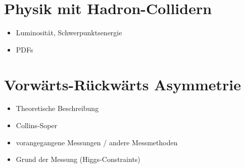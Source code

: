 \section{Physik mit Hadron-Collidern}
\label{theory:hadron_collider}

\begin{itemize}
    \item Luminosität, Schwerpunktsenergie
    \item PDFs
\end{itemize}



\section{Vorwärts-Rückwärts Asymmetrie}
\label{theory:afb}

\begin{itemize}
    \item Theoretische Beschreibung
    \item Collins-Soper
    \item vorangegangene Messungen / andere Messmethoden
    \item Grund der Messung (Higgs-Constraints)
\end{itemize}



